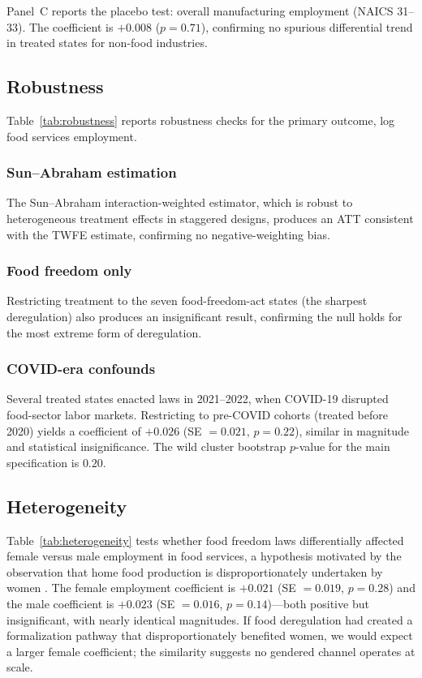 \documentclass[12pt]{article}
\begin{document}
Panel~C reports the placebo test: overall manufacturing employment (NAICS 31--33). The coefficient is $+0.008$ ($p = 0.71$), confirming no spurious differential trend in treated states for non-food industries.

\subsection{Robustness}



Table~\ref{tab:robustness} reports robustness checks for the primary outcome, log food services employment.

\subsubsection*{Sun--Abraham estimation} The Sun--Abraham interaction-weighted estimator, which is robust to heterogeneous treatment effects in staggered designs, produces an ATT consistent with the TWFE estimate, confirming no negative-weighting bias.

\subsubsection*{Food freedom only} Restricting treatment to the seven food-freedom-act states (the sharpest deregulation) also produces an insignificant result, confirming the null holds for the most extreme form of deregulation.

\subsubsection*{COVID-era confounds} Several treated states enacted laws in 2021--2022, when COVID-19 disrupted food-sector labor markets. Restricting to pre-COVID cohorts (treated before 2020) yields a coefficient of $+0.026$ (SE $= 0.021$, $p = 0.22$), similar in magnitude and statistical insignificance. The wild cluster bootstrap $p$-value for the main specification is $0.20$.

\subsection{Heterogeneity}



Table~\ref{tab:heterogeneity} tests whether food freedom laws differentially affected female versus male employment in food services, a hypothesis motivated by the observation that home food production is disproportionately undertaken by women \citep{ij2023safety}. The female employment coefficient is $+0.021$ (SE $= 0.019$, $p = 0.28$) and the male coefficient is $+0.023$ (SE $= 0.016$, $p = 0.14$)---both positive but insignificant, with nearly identical magnitudes. If food deregulation had created a formalization pathway that disproportionately benefited women, we would expect a larger female coefficient; the similarity suggests no gendered channel operates at scale.
\end{document}
